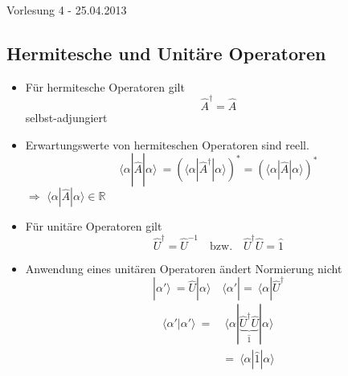 \documentclass[10pt,article,colorback,accentcolor=tud9d]{scrartcl}
\begin{document}
\begin{flushright}
Vorlesung 4 - 25.04.2013
\end{flushright}

\subsection{Hermitesche und Unitäre Operatoren}
\begin{itemize}
  \item Für hermitesche Operatoren gilt
    \begin{equation}
    \hat{A}^{\dagger}=\hat{A}
    \end{equation}
    selbst-adjungiert
  \item Erwartungswerte von hermiteschen Operatoren sind reell.
    \begin{equation}
    \langle \alpha\left.\right|\hat{A}\left.\right|\alpha\rangle  \ =  \left(\langle \alpha \left.\right| \hat{A}^{\dagger} \left.\right| \alpha \rangle \right)^* = \left(\langle \alpha \left.\right|\hat{A}\left.\right|\alpha\rangle \right)^*
    \end{equation}
    $\Rightarrow$ $\langle \alpha\left.\right|\hat{A}\left.\right|\alpha\rangle  \in \mathbb{R}$
  \item Für unitäre Operatoren gilt
    \begin{equation}
    \hat{U}^{\dagger}=\hat{U}^{-1} \quad \text{bzw.} \quad \hat{U}^{\dagger}\hat{U}=\hat{1}
    \end{equation}
  \item Anwendung eines unitären Operatoren ändert Normierung nicht
    \begin{equation} \nonumber
     \left.\right|\alpha'\rangle  \ = \hat{U}\left.\right|\alpha\rangle  \quad \langle \alpha'\left.\right|= \ \langle \alpha\left.\right|\hat{U}^{\dagger}
    \end{equation}
    \begin{equation}
    \begin{aligned}
    \langle \alpha'\left.\right|\alpha'\rangle  \ =& \ \langle \alpha\left.\right|\underbrace{\hat{U}^{\dagger}\hat{U}}_{\hat{1}}\left.\right|\alpha\rangle \\
    &= \ \langle \alpha\left.\right|\hat{1}\left.\right|\alpha\rangle 
    \end{aligned}
    \end{equation}
    \end{itemize}
\end{document}

